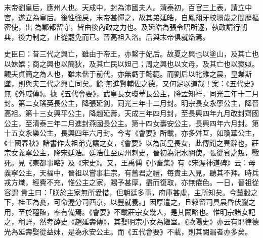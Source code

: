 \begin{pinyinscope}
 末帝劉皇后，應州人也。天成中，封為沛國夫人。清泰初，百官三上表，請立中宮，遂立為皇后。後性強戾，末帝甚憚之，故其弟延皓，自鳳翔牙校環歲之間歷樞密使，出
 為鄴都留守，皆由後內政之力也。及延皓為張令昭所逐，執政請行朝典，後力制之，止從罷免而已。晉高祖入洛。后與末帝俱就燔焉。



 史臣曰：昔三代之興亡，雖由于帝王，亦繫于妃后。故夏之興也以塗山，及其亡也以妹嬉；商之興也以簡狄，及其亡民以妲己；周之興也以文母，及其亡也以褒姒。觀夫貞簡之為人也，雖未偕于前代，亦無虧于懿範。而劉后以牝雞之晨，皇業斯墜，則與夫三代之興亡同矣。餘
 無進賢輔佐之德，又何足以道哉！案：《五代史》無《外戚傳》。據《五代會要》，武皇長女瓊華長公主，降孟知祥，同光三年十二月封。第二女瑤英長公主，降張延釗，同光三年十二月封。明宗長女永寧公主，降晉高祖。第十三女興平公主，降趙延壽，天成三年四月封，至長興四年九月改封齊國公主，至清泰三年二月進封燕國長公主。第十四女壽安公主，長興四年六月封。第十五女永樂公主，長興四年六月封。今考《會要》所載，亦多舛互，如瓊華公主，《十國春秋》諸書作太祖弟克讓之女，《會要》以為武皇長女，此傳聞之異辭也。莊宗女義寧公主，降宋廷浩。廷浩仕至房州刺史，晉初為汜水關使，張從賓之叛，戰死。見《東都事略》及《宋史》。又，王禹偁《小畜集》有《宋渥神道碑》云：母義寧公主，天福中，晉祖以嘗事莊宗，有舊君之禮，每貴主入見，聽其不拜。時兵戎方熾，經費不充，惟公主之家，賜予甚厚，盡而復取，亦無倦色。一日，晉祖從容謂
 貴主曰：「朕於主家無所愛惜，但朝廷多事，府庫甚虛，主所知矣。今輦轂之下，桂玉為憂，可命渥分司西京，以豐就養。」因厚遣之，且敕留司具晨昏伏臘之用，至於醯醢，率有備焉。《會要》不載莊宗女幾人，是其闕略也。惟明宗諸女記之，稍詳，然考薛史《趙延壽傳》，其娶明宗小女為繼室。《歐陽史》亦云有耶律德光為延壽娶從益妹，是為永安公主。而《五代會要》不載，則其闕漏者亦多矣。



\end{pinyinscope}